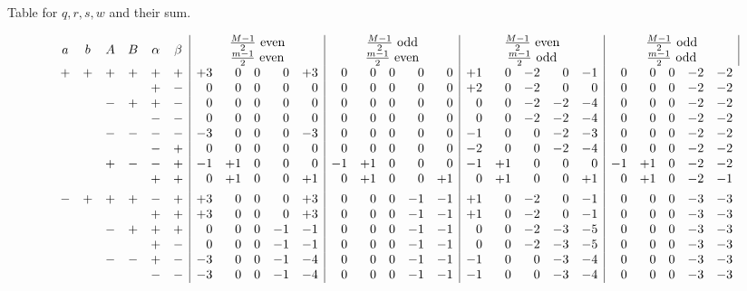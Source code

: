 \begin{center}Table for $q,r,s,w$ and their sum.\end{center}
\begingroup\scriptsize\setlength{\arraycolsep}{1.1pt}\renewcommand{\arraystretch}{1.12}
\[
\begin{array}{cccccc|rrrrr|rrrrr|rrrrr|rrrrr}
a&b&A&B&\alpha&\beta&\multicolumn{5}{c|}{\begin{array}{c}\frac{M-1}{2}\ \text{even}\\\frac{m-1}{2}\ \text{even}\end{array}}&\multicolumn{5}{c|}{\begin{array}{c}\frac{M-1}{2}\ \text{odd}\\\frac{m-1}{2}\ \text{even}\end{array}}&\multicolumn{5}{c|}{\begin{array}{c}\frac{M-1}{2}\ \text{even}\\\frac{m-1}{2}\ \text{odd}\end{array}}&\multicolumn{5}{c|}{\begin{array}{c}\frac{M-1}{2}\ \text{odd}\\\frac{m-1}{2}\ \text{odd}\end{array}}\\[4pt]
+&+&+&+&+&+&+3&0&0&0&+3&0&0&0&0&0&+1&0&-2&0&-1&0&0&0&-2&-2\\
&&&&+&-&0&0&0&0&0&0&0&0&0&0&+2&0&-2&0&0&0&0&0&-2&-2\\
&&-&+&+&-&0&0&0&0&0&0&0&0&0&0&0&0&-2&-2&-4&0&0&0&-2&-2\\
&&&&-&-&0&0&0&0&0&0&0&0&0&0&0&0&-2&-2&-4&0&0&0&-2&-2\\
&&-&-&-&-&-3&0&0&0&-3&0&0&0&0&0&-1&0&0&-2&-3&0&0&0&-2&-2\\
&&&&-&+&0&0&0&0&0&0&0&0&0&0&-2&0&0&-2&-4&0&0&0&-2&-2\\
&&+&-&-&+&-1&+1&0&0&0&-1&+1&0&0&0&-1&+1&0&0&0&-1&+1&0&-2&-2\\
&&&&+&+&0&+1&0&0&+1&0&+1&0&0&+1&0&+1&0&0&+1&0&+1&0&-2&-1\\[4pt]
-&+&+&+&-&+&+3&0&0&0&+3&0&0&0&-1&-1&+1&0&-2&0&-1&0&0&0&-3&-3\\
&&&&+&+&+3&0&0&0&+3&0&0&0&-1&-1&+1&0&-2&0&-1&0&0&0&-3&-3\\
&&-&+&+&+&0&0&0&-1&-1&0&0&0&-1&-1&0&0&-2&-3&-5&0&0&0&-3&-3\\
&&&&+&-&0&0&0&-1&-1&0&0&0&-1&-1&0&0&-2&-3&-5&0&0&0&-3&-3\\
&&-&-&+&-&-3&0&0&-1&-4&0&0&0&-1&-1&-1&0&0&-3&-4&0&0&0&-3&-3\\
&&&&-&-&-3&0&0&-1&-4&0&0&0&-1&-1&-1&0&0&-3&-4&0&0&0&-3&-3\\

\end{array}\]
